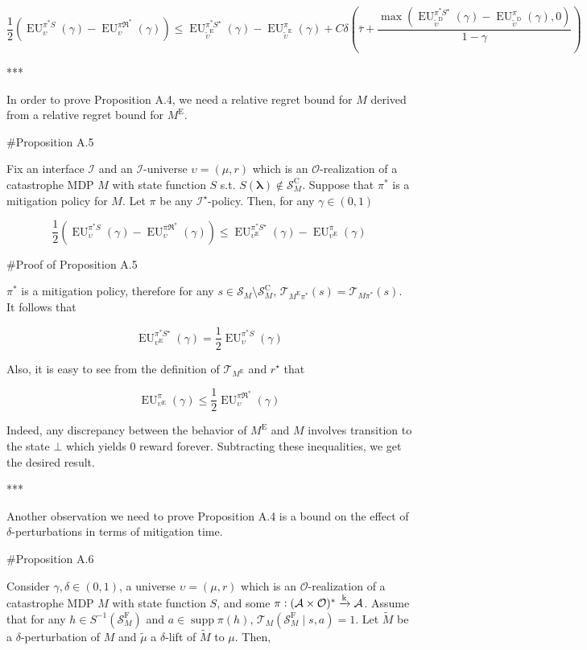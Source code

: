 \documentclass[a4paper]{article}
\DeclareMathOperator{\Supp}{supp}
\newcommand{\AP}[1]{\left(#1\right)}
\newcommand{\Estr}{\boldsymbol{\lambda}}
\newcommand{\M}{\xrightarrow{\textnormal{k}}}
\newcommand{\Ob}{\mathcal{O}}
\newcommand{\A}{\mathcal{A}}
\newcommand{\St}{\mathcal{S}}
\newcommand{\T}{\mathcal{T}}
\newcommand{\In}{\mathcal{I}}
\newcommand{\FH}{(\A \times \Ob)^*}
\newcommand{\RMC}{\mathrm{C}}
\newcommand{\RMD}{\mathrm{D}}
\newcommand{\RME}{\mathrm{E}}
\newcommand{\RMF}{\mathrm{F}}
\newcommand{\SF}{\St^{\RMF}}
\newcommand{\SC}{\St^{\RMC}}
\newcommand{\ME}{M^{\RME}}
\newcommand{\EU}{\operatorname{EU}}
\begin{document}
$$\frac{1}{2}\AP{\EU_{\upsilon}^{\pi^* S}(\gamma)-\EU_{\upsilon}^{\pi\Re^*}(\gamma)} \leq \EU_{\tilde{\upsilon}^{\RME}}^{\pi^* S^\star}(\gamma)-\EU_{\tilde{\upsilon}^{\RME}}^{\pi}(\gamma) + C\delta\AP{\bar{\tau}+\frac{\max\AP{\EU_{\tilde{\upsilon}^{\RMD}}^{\pi^* S^\star}(\gamma)-\EU_{\tilde{\upsilon}^{\RMD}}^{\pi}(\gamma),0}}{1-\gamma}}$$

***

In order to prove Proposition A.4, we need a relative regret bound for $M$ derived from a relative regret bound for $\ME$.

\#Proposition A.5

Fix an interface $\In$ and an $\In$-universe $\upsilon=(\mu,r)$ which is an $\Ob$-realization of a catastrophe MDP $M$ with state function $S$ s.t. $S(\Estr)\not\in\SC_M$. Suppose that $\pi^*$ is a mitigation policy for $M$. Let $\pi$ be any $\In^\star$-policy. Then, for any $\gamma\in(0,1)$

$$\frac{1}{2}\AP{\EU_{\upsilon}^{\pi^* S}(\gamma)-\EU_{\upsilon}^{\pi\Re^*}(\gamma)} \leq \EU_{\upsilon^\RME}^{\pi^* S^\star}(\gamma)-\EU_{\upsilon^\RME}^{\pi}(\gamma)$$

\#Proof of Proposition A.5

$\pi^*$ is a mitigation policy, therefore for any $s \in \St_M \setminus \SC_M$, $\T_{\ME\pi^*}(s)=\T_{M\pi^*}(s)$. It follows that 

$$\EU_{\upsilon^\RME}^{\pi^* S^\star}(\gamma) = \frac{1}{2}\EU_{\upsilon}^{\pi^* S}(\gamma)$$

Also, it is easy to see from the definition of $\T_{\ME}$ and $r^\star$ that

$$\EU_{\upsilon^\RME}^{\pi}(\gamma) \leq \frac{1}{2}\EU_{\upsilon}^{\pi\Re^*}(\gamma)$$

Indeed, any discrepancy between the behavior of $\ME$ and $M$ involves transition to the state $\bot$ which yields 0 reward forever. Subtracting these inequalities, we get the desired result.

***

Another observation we need to prove Proposition A.4 is a bound on the effect of $\delta$-perturbations in terms of mitigation time.

\#Proposition A.6

Consider $\gamma,\delta\in(0,1)$, a universe $\upsilon=(\mu,r)$ which is an $\Ob$-realization of a catastrophe MDP $M$ with state function $S$, and some $\pi: \FH \M \A$. Assume that for any $h \in S^{-1}\AP{\SF_M}$ and $a \in \Supp{\pi(h)}$, $\T_M\AP{\SF_M \mid s,a} = 1$. Let $\tilde{M}$ be a $\delta$-perturbation of $M$ and $\tilde{\mu}$ a $\delta$-lift of $\tilde{M}$ to $\mu$. Then,
\end{document}
